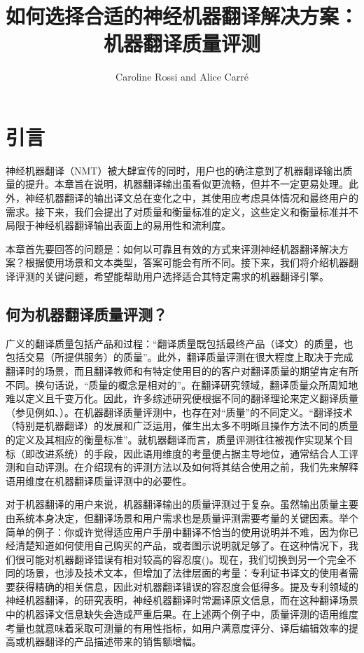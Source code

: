 \documentclass[output=paper]{langscibook}
\author{Caroline Rossi\affiliation{格勒诺布尔-阿尔卑斯大学} and Alice Carré\affiliation{格勒诺布尔-阿尔卑斯大学}}
\title[如何选择合适的神经机器翻译方案]{如何选择合适的神经机器翻译解决方案：机器翻译质量评测}
\begin{document}
\maketitle


\section{引言}

神经机器翻译（NMT）被大肆宣传的同时，用户也的确注意到了机器翻译输出质量的提升。本章旨在说明，机器翻译输出虽看似更流畅，但并不一定更易处理。此外，神经机器翻译的输出译文总在变化之中，其使用应考虑具体情况和最终用户的需求。接下来，我们会提出了对质量和衡量标准的定义，这些定义和衡量标准并不局限于神经机器翻译输出表面上的易用性和流利度。


本章首先要回答的问题是：如何以可靠且有效的方式来评测神经机器翻译解决方案？根据使用场景和文本类型，答案可能会有所不同。接下来，我们将介绍机器翻译评测的关键问题，希望能帮助用户选择适合其特定需求的机器翻译引擎。


\subsection{何为机器翻译质量评测？}
广义的翻译质量包括产品和过程：“翻译质量既包括最终产品（译文）的质量，也包括交易（所提供服务）的质量”\citep[270]{Gouadec2010}。此外，翻译质量评测在很大程度上取决于完成翻译时的场景，而且翻译教师和有特定使用目的的客户对翻译质量的期望肯定有所不同。换句话说，“质量的概念是相对的”\citep[232]{Grbić2008}。在翻译研究领域，翻译质量众所周知地难以定义且千变万化。因此，许多综述研究便根据不同的翻译理论来定义翻译质量（参见例如\citealt{Drugan2013}、\citealt{House2015}）。在机器翻译质量评测中，也存在对“质量”的不同定义。“翻译技术（特别是机器翻译）的发展和广泛运用，催生出太多不明晰且操作方法不同的质量的定义及其相应的衡量标准”\citep[131]{Doherty2017}。就机器翻译而言，质量评测往往被视作实现某个目标（即改进系统）的手段，因此语用维度的考量便占据主导地位，通常结合人工评测和自动评测\citep[133]{Doherty2017}。在介绍现有的评测方法以及如何将其结合使用之前，我们先来解释语用维度在机器翻译质量评测中的必要性。

对于机器翻译的用户来说，机器翻译输出的质量评测过于复杂。虽然输出质量主要由系统本身决定，但翻译场景和用户需求也是质量评测需要考量的关键因素。举个简单的例子：你或许觉得适应用户手册中翻译不恰当的使用说明并不难，因为你已经清楚知道如何使用自己购买的产品，或者图示说明就足够了。在这种情况下，我们很可能对机器翻译错误有相对较高的容忍度(\citealt{CastilhoOBrien2016})。现在，我们切换到另一个完全不同的场景，也涉及技术文本，但增加了法律层面的考量：专利证书译文的使用者需要获得精确的相关信息，因此对机器翻译错误的容忍度会低得多。提及专利领域的神经机器翻译，\citet[113]{CastilhoWay2017}的研究表明，神经机器翻译时常漏译原文信息，而在这种翻译场景中的机器译文信息缺失会造成严重后果。在上述两个例子中，质量评测的语用维度考量也就意味着采取可测量的有用性指标，如用户满意度评分、译后编辑效率的提高或机器翻译的产品描述带来的销售额增幅。
\end{document}

